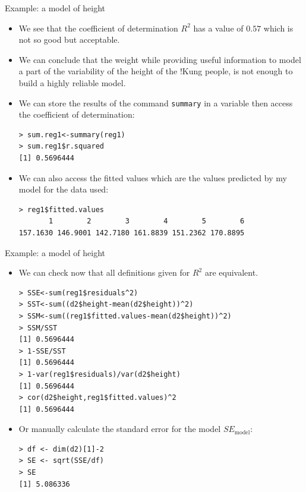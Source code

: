 \documentclass[handout]{beamer}
\begin{document}
\begin{frame}[fragile]{Example: a model of height}
\scriptsize{
\begin{itemize}
 \item We see that the coefficient of determination $R^2$ has a value of $0.57$ which is not so good but acceptable.
 
 
  \item We can conclude that the weight while providing useful information to model a part of the variability of the height of the !Kung people, is not enough to build a highly reliable model. 
  
  \item We can store the results of the command \verb+summary+ in a variable then access the coefficient of determination:
\begin{verbatim}
> sum.reg1<-summary(reg1)
> sum.reg1$r.squared
[1] 0.5696444  
\end{verbatim}

\item  We can also access the fitted values which are the values predicted by my model for the data used:
\begin{verbatim}
> reg1$fitted.values
       1        2        3        4        5        6      
157.1630 146.9001 142.7180 161.8839 151.2362 170.8895 
\end{verbatim}
 
 \end{itemize}
 

} 
\end{frame}



\begin{frame}[fragile]{Example: a model of height}
\scriptsize{
\begin{itemize}
 \item We can check now that all definitions given for $R^2$ are equivalent.
 
 \begin{verbatim}
> SSE<-sum(reg1$residuals^2)
> SST<-sum((d2$height-mean(d2$height))^2)
> SSM<-sum((reg1$fitted.values-mean(d2$height))^2)
> SSM/SST
[1] 0.5696444
> 1-SSE/SST
[1] 0.5696444
> 1-var(reg1$residuals)/var(d2$height)
[1] 0.5696444
> cor(d2$height,reg1$fitted.values)^2
[1] 0.5696444
 \end{verbatim}

 \item Or manually calculate the standard error for the model $SE_{\text{model}}$:
 
 \begin{verbatim}
> df <- dim(d2)[1]-2
> SE <- sqrt(SSE/df)
> SE
[1] 5.086336 
 \end{verbatim}

 
 
 \end{itemize}
 

} 
\end{frame}
\end{document}

